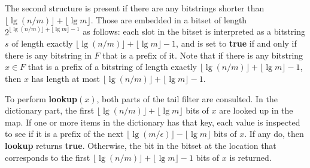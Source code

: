 \documentclass[11pt,letterpaper]{article}
\begin{document}





The second structure is present if there are any bitstrings shorter than $\lfloor \lg (n/m) \rfloor + \lfloor \lg m \rfloor$.
Those are embedded in a bitset of length $2^{\lfloor \lg (n/m) \rfloor + \lfloor \lg m \rfloor - 1}$ as follows:
each slot in the bitset is interpreted as a bitstring $s$ of length exactly $\lfloor \lg (n/m) \rfloor + \lfloor \lg m \rfloor - 1$, and is set to {\bf true} if and only if there is any bitstring in $F$ that is a prefix of it.
Note that if there is any bitstring $x \in F$ that is a prefix of a bitstring of length exactly $\lfloor \lg (n/m) \rfloor + \lfloor \lg m \rfloor - 1$, then $x$ has length at most $\lfloor \lg (n/m) \rfloor + \lfloor \lg m \rfloor - 1$.

To perform {\bf lookup$(x)$}, both parts of the tail filter are consulted.
In the dictionary part, the first $\lfloor \lg (n/m) \rfloor + \lfloor \lg m \rfloor$ bits of $x$ are looked up in the map.
If one or more items in the dictionary has that key, each value is inspected to see if it is a prefix of the next $\lfloor \lg(m/\epsilon) \rfloor - \lfloor \lg m \rfloor$ bits of $x$.
If any do, then {\bf lookup} returns {\bf true}.
Otherwise, the bit in the bitset at the location that corresponds to the first $\lfloor \lg (n/m) \rfloor + \lfloor \lg m \rfloor - 1$ bits of $x$ is returned.
\end{document}
